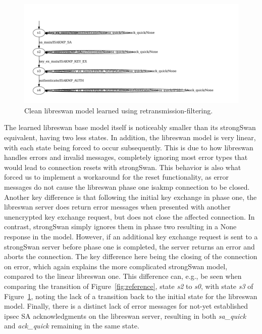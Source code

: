 \begin{figure}[H]
	\centering
	\includegraphics[width=\linewidth]{images/models/LearnedModelLibreSimple}
	\caption{Clean libreswan model learned using retransmission-filtering.}
	\label{fig:learnedmodellibresimple}
\end{figure}

The learned libreswan base model itself is noticeably smaller than its strongSwan equivalent, having two less states. In addition, the libreswan model is very linear, with each state being forced to occur subsequently. This is due to how libreswan handles errors and invalid messages, completely ignoring most error types that would lead to connection resets with strongSwan. This behavior is also what forced us to implement a workaround for the reset functionality, as error messages do not cause the libreswan phase one \ac{isakmp} connection to be closed. Another key difference is that following the initial key exchange in phase one, the libreswan server does return error messages when presented with another unencrypted key exchange request, but does not close the affected connection. In contrast, strongSwan simply ignores them in phase two resulting in a None response in the model. However, if an additional key exchange request is sent to a strongSwan server before phase one is completed, the server returns an error and aborts the connection. The key difference here being the closing of the connection on error, which again explains the more complicated strongSwan model, compared to the linear libreswan one. This difference can, e.g., be seen when comparing the transition of Figure~\ref{fig:reference}, state \emph{s2} to \emph{s0}, with state \emph{s3} of Figure~\ref{fig:learnedmodellibresimple}, noting the lack of a transition back to the initial state for the libreswan model. Finally, there is a distinct lack of error messages for not-yet established \ac{ipsec} SA acknowledgments on the libreswan server, resulting in both \emph{sa\_quick} and \emph{ack\_quick} remaining in the same state. 
\newpage


